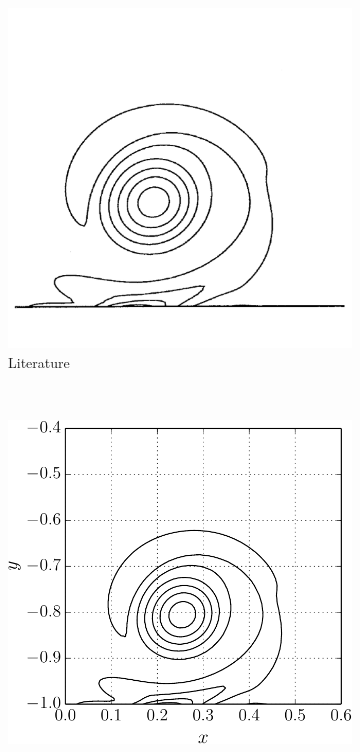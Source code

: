	\begin{figure}[p]
     \centering
     \begin{subfigure}[t]{0.4\textwidth}
             \includegraphics[width=\textwidth]{figures/eulerian/VorticityContourPlot-rotated270.pdf}
             \caption{Literature}
             \label{fig:VorticityContourPlot}
     \end{subfigure}%
     ~ %
     \begin{subfigure}[t]{0.5\textwidth}
             \includegraphics[width=\textwidth]{figures/eulerian/dipole_contourLine_t1p0_corrected-crop.pdf}

\end{subfigure}
\end{figure}
